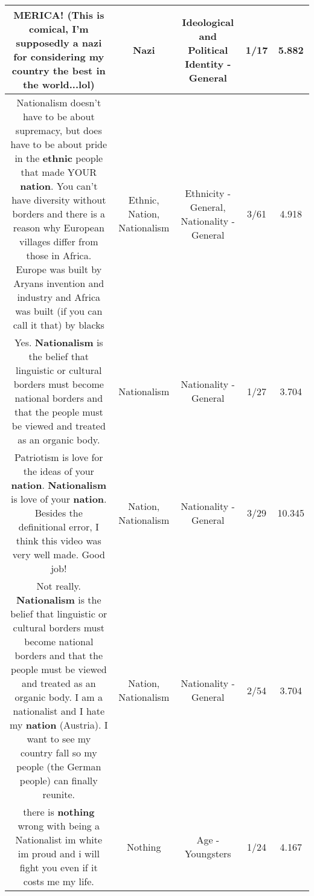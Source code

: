 \documentclass[11pt]{article}
\newlength\mylength
\begin{document}
\begin{center}
\begin{longtable}{|C{.65\mylength}|C{.30\mylength}|C{.12\mylength}|C{.12\mylength}|C{.12\mylength}|}
  \small MERICA! (This is comical, I'm supposedly a \textbf{nazi} for considering my country the best in the world...lol)\normalsize   & Nazi &  Ideological and Political Identity - General & 1/17 & 5.882 \\  \hline
  \small Nationalism doesn't have to be about supremacy, but does have to be about pride in the \textbf{ethnic} people that made YOUR \textbf{nation}. You can't have diversity without borders and there is a reason why European villages differ from those in Africa. Europe was built by Aryans invention and industry and Africa was built (if you can call it that) by blacks\normalsize   & Ethnic, Nation, Nationalism & Ethnicity - General, Nationality - General & 3/61 & 4.918 \\  \hline
  \small Yes. \textbf{Nationalism} is the belief that linguistic or cultural borders must become national borders and that the people must be viewed and treated as an organic body.\normalsize   & Nationalism & Nationality - General & 1/27 & 3.704 \\  \hline
  \small Patriotism is love for the ideas of your \textbf{nation}. \textbf{Nationalism} is love of your \textbf{nation}. Besides the definitional error, I think this video was very well made. Good job!\normalsize   & Nation, Nationalism & Nationality - General & 3/29 & 10.345 \\  \hline
  \small Not really. \textbf{Nationalism} is the belief that linguistic or cultural borders must become national borders and that the people must be viewed and treated as an organic body. I am a nationalist and I hate my \textbf{nation} (Austria). I want to see my country fall so my people (the German people) can finally reunite.\normalsize   & Nation, Nationalism & Nationality - General & 2/54 & 3.704 \\  \hline
  \small there is \textbf{nothing} wrong with being a Nationalist im white im proud and i will fight you even if it costs me my life.\normalsize   & Nothing & Age - Youngsters & 1/24 & 4.167 \\  \hline

\end{longtable}
\end{center}
\end{document}
